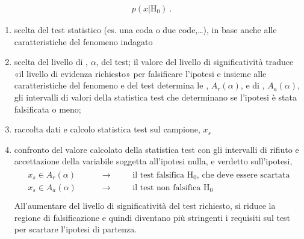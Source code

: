 \documentclass[letterpaper,10pt,italian]{jupyterBook}
\begin{document}
\begin{equation*}
\begin{split}p(x|\text{H}_0) \ .\end{split}
\end{equation*}\begin{enumerate}
%
\setcounter{enumi}{2}
\item {} 
\sphinxAtStartPar
scelta del test statistico (es. una coda o due code,…), in base anche alle caratteristiche del fenomeno indagato

\item {} 
\sphinxAtStartPar
scelta del livello di , \(\alpha\), del test; il valore del livello di significatività traduce «il livello di evidenza richiesto» per falsificare l’ipotesi e \sphinxhyphen{} insieme alle caratteristiche del fenomeno e del test \sphinxhyphen{} determina le , \(A_r(\alpha)\), e di , \(A_a(\alpha)\), gli intervalli di valori della statistica test che determinano se l’ipotesi è stata falsificata o meno;

\item {} 
\sphinxAtStartPar
raccolta dati e calcolo statistica test sul campione, \(x_s\)

\item {} 
\sphinxAtStartPar
confronto del valore calcolato della statistica test con gli intervalli di rifiuto e accettazione della variabile soggetta all’ipotesi nulla, e verdetto sull’ipotesi,
\begin{equation*}
\begin{split}\begin{aligned}
      x_s \in A_r(\alpha) \qquad & \rightarrow \qquad \text{ il test falsifica $\text{H}_0$, che deve essere scartata} \\
      x_s \in A_a(\alpha) \qquad & \rightarrow \qquad \text{ il test non falsifica $\text{H}_0$} \\
    \end{aligned}\end{split}
\end{equation*}
\sphinxAtStartPar
All’aumentare del livello di significatività del test richiesto, si riduce la regione di falsificazione e quindi diventano più stringenti i requisiti sul test per scartare l’ipotesi di partenza.

\end{enumerate}
\end{document}
